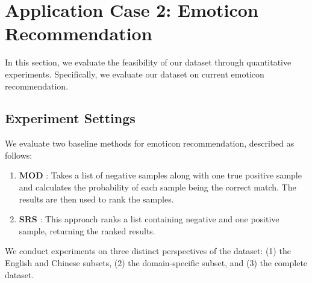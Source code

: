 \section{Application Case 2: Emoticon Recommendation}
\label{sec:experiments}
In this section, we evaluate the feasibility of our dataset through quantitative experiments. Specifically, we evaluate our dataset on current emoticon recommendation.


\subsection{Experiment Settings} 
We evaluate two baseline methods for emoticon recommendation, described as follows:

\begin{enumerate} 
    \item \textbf{MOD} \cite{MOD}: Takes a list of negative samples along with one true positive sample and calculates the probability of each sample being the correct match. The results are then used to rank the samples.
    \item \textbf{SRS} \cite{learning-to-respond-2021}: This approach ranks a list containing negative and one positive sample, returning the ranked results.
\end{enumerate}

We conduct experiments on three distinct perspectives of the dataset: (1) the English and Chinese subsets, (2) the domain-specific subset, and (3) the complete dataset.

